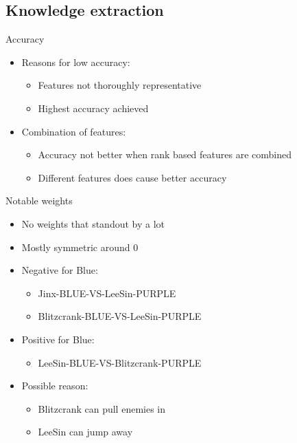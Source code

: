 \subsection{Knowledge extraction}
\begin{frame}{Accuracy}
\begin{itemize}
\item Reasons for low accuracy:
\begin{itemize}
\item Features not thoroughly  representative
\item Highest accuracy achieved
\end{itemize}
\item Combination of features:
\begin{itemize}
\item Accuracy not better when rank based features are combined
\item Different features does cause better accuracy
\end{itemize}
\end{itemize}
\end{frame}

\begin{frame}{Notable weights}
  \begin{itemize}
  \item No weights that standout by a lot
  \item Mostly symmetric around 0
  \end{itemize}
  \vspace{0.05cm}
  \begin{itemize}
  \item Negative for Blue:
    \begin{itemize}
    \item Jinx-BLUE-VS-LeeSin-PURPLE
    \item Blitzcrank-BLUE-VS-LeeSin-PURPLE
    \end{itemize}
  \item Positive for Blue:
    \begin{itemize}
    \item LeeSin-BLUE-VS-Blitzcrank-PURPLE
    \end{itemize}
  \item Possible reason:
    \begin{itemize}
    \item Blitzcrank can pull enemies in
    \item LeeSin can jump away
    \end{itemize}
  \end{itemize}
\end{frame}

